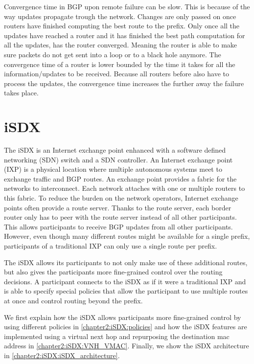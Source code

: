 Convergence time in BGP upon remote failure can be slow.
This is because of the way updates propagate trough the network. Changes are only passed on once routers have finished computing the best route to the prefix. Only once all the updates have reached a router and it has finished the best path computation for all the updates, has the router converged. Meaning the router is able to make sure packets do not get sent into a loop or to a black hole anymore. The convergence time of a router is lower bounded by the time it takes for all the information/updates to be received. Because all routers before also have to process  the updates, the convergence time increases the further away the failure takes place. 


\section{\label{chapter2:iSDX}iSDX}

The iSDX is an Internet exchange point enhanced with a software defined networking (SDN) switch and a SDN controller.
An Internet exchange point (IXP) is a physical location where multiple autonomous systems meet to exchange traffic and BGP routes. An exchange point provides a fabric for the networks to interconnect. Each network attaches with one or multiple routers to this fabric. To reduce the burden on the network operators, Internet exchange points often provide a route server. Thanks to the route server, each border router only has to peer with the route server instead of all other participants. This allows participants to receive BGP updates from all other participants. However, even though many different routes might be available for a single prefix, participants of a traditional IXP can only use a single route per prefix.

The iSDX allows its participants to not only make use of these additional routes, but also gives the participants  more fine-grained control over the routing decisions. A participant connects to the iSDX as if it were a traditional IXP and is able to specify special policies that allow the participant to use multiple routes at once and control routing beyond the prefix.

We first explain how the iSDX allows participants more fine-grained control by using different policies in \ref{chapter2:iSDX:policies} and how the iSDX features are implemented using a virtual next hop and repurposing the destination mac address in \ref{chapter2:iSDX:VNH_VMAC}. Finally, we show the iSDX architecture in \ref{chapter2:iSDX:iSDX_architecture}.

